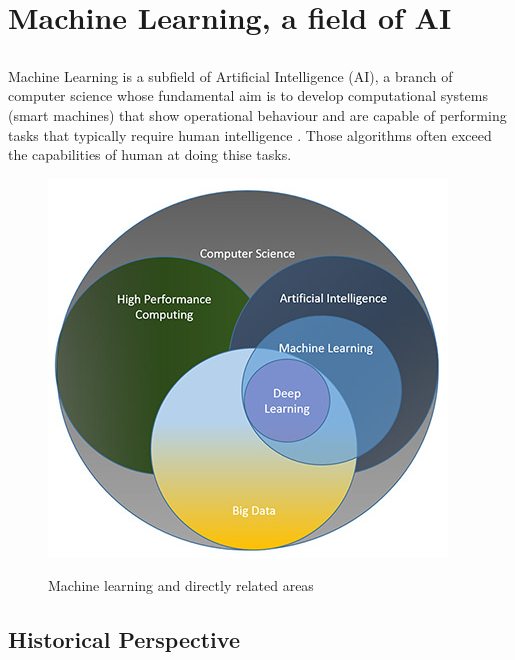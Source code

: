 \chapter{Machine Learning, a field of AI}\label{chap:chap3}

\section*{}

\paragraph{}Machine Learning is a subfield of Artificial Intelligence (AI), a branch of computer science whose  fundamental aim is to develop computational systems (smart machines) that show operational behaviour and are capable of performing tasks that typically require human intelligence \citet{Spalding1981}. Those algorithms often exceed the capabilities of human at doing thise tasks.

\begin{figure}[ht]
    \centering
    \includegraphics[scale=0.6]{figures/ai.jpg}\citet{ai}
    \caption{Machine learning and directly related areas}
    \label{fig:ML}
\end{figure}

\section{Historical Perspective}

